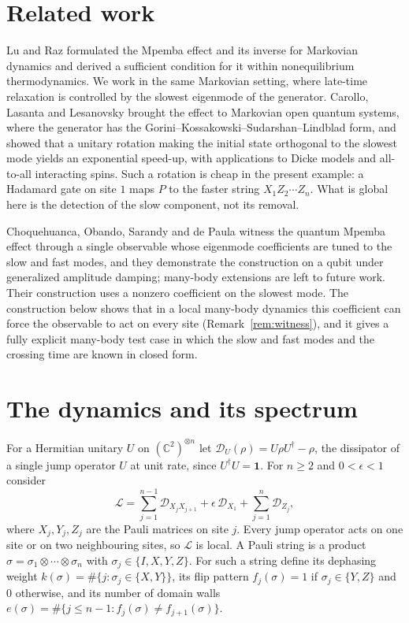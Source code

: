 \documentclass[11pt,a4paper]{article}
\theoremstyle{definition}
\theoremstyle{plain}
\newcommand{\one}{\mathbf{1}}
\newcommand{\cL}{\mathcal{L}}
\newcommand{\cD}{\mathcal{D}}
\begin{document}
\section{Related work}\label{sec:related}
Lu and Raz \cite{LuRaz2017} formulated the Mpemba effect and its inverse
for Markovian dynamics and derived a sufficient condition for it within
nonequilibrium thermodynamics. We work in the same Markovian setting, where
late-time relaxation is controlled by the slowest eigenmode of the generator.
Carollo, Lasanta and Lesanovsky \cite{Carollo2021} brought the effect to
Markovian open quantum systems, where the generator has the
Gorini--Kossakowski--Sudarshan--Lindblad form, and
showed that a unitary rotation making the initial state orthogonal to the
slowest mode yields an exponential speed-up, with applications to Dicke
models and all-to-all interacting spins. Such a rotation is cheap in the
present example: a Hadamard gate on site $1$ maps $P$ to the faster string
$X_1Z_2\cdots Z_n$. What is global here is the detection of the slow
component, not its removal.

Choquehuanca, Obando, Sarandy and de Paula \cite{Choquehuanca2026} witness
the quantum Mpemba effect through a single observable whose eigenmode
coefficients are tuned to the slow and fast modes, and they demonstrate the
construction on a qubit under generalized amplitude damping; many-body
extensions are left to future work. Their construction uses a nonzero
coefficient on the slowest mode. The construction below shows that in a
local many-body dynamics this coefficient can force the observable to act on
every site (Remark~\ref{rem:witness}), and it gives a fully explicit
many-body test case in which the slow and fast modes and the crossing time
are known in closed form.

\section{The dynamics and its spectrum}\label{sec:spectrum}
For a Hermitian unitary $U$ on $(\mathbb C^2)^{\otimes n}$ let
$\cD_U(\rho)=U\rho U^\dagger-\rho$, the dissipator of a single jump operator
$U$ at unit rate, since $U^\dagger U=\one$. For $n\ge2$ and $0<\epsilon<1$
consider
\begin{equation}\label{eq:L}
\cL=\sum_{j=1}^{n-1}\cD_{X_jX_{j+1}}+\epsilon\,\cD_{X_1}
+\sum_{j=1}^n\cD_{Z_j},
\end{equation}
where $X_j,Y_j,Z_j$ are the Pauli matrices on site $j$. Every jump operator
acts on one site or on two neighbouring sites, so $\cL$ is local. A Pauli
string is a product $\sigma=\sigma_1\otimes\cdots\otimes\sigma_n$ with
$\sigma_j\in\{I,X,Y,Z\}$. For such a string define its dephasing weight
$k(\sigma)=\#\{j:\sigma_j\in\{X,Y\}\}$, its flip pattern
$f_j(\sigma)=1$ if $\sigma_j\in\{Y,Z\}$ and $0$ otherwise, and its number of
domain walls $e(\sigma)=\#\{j\le n-1: f_j(\sigma)\ne f_{j+1}(\sigma)\}$.
\end{document}
